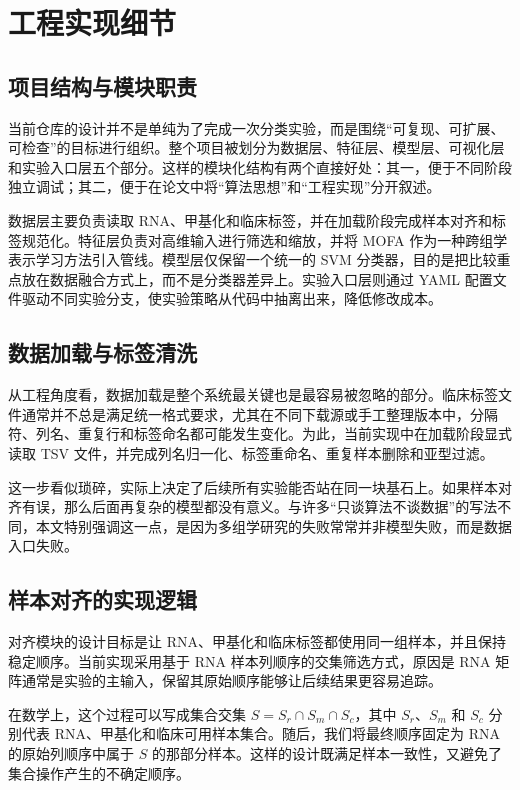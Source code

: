 \section{工程实现细节}

\subsection{项目结构与模块职责}

当前仓库的设计并不是单纯为了完成一次分类实验，而是围绕“可复现、可扩展、可检查”的目标进行组织。整个项目被划分为数据层、特征层、模型层、可视化层和实验入口层五个部分。这样的模块化结构有两个直接好处：其一，便于不同阶段独立调试；其二，便于在论文中将“算法思想”和“工程实现”分开叙述。

数据层主要负责读取 RNA、甲基化和临床标签，并在加载阶段完成样本对齐和标签规范化。特征层负责对高维输入进行筛选和缩放，并将 MOFA 作为一种跨组学表示学习方法引入管线。模型层仅保留一个统一的 SVM 分类器，目的是把比较重点放在数据融合方式上，而不是分类器差异上。实验入口层则通过 YAML 配置文件驱动不同实验分支，使实验策略从代码中抽离出来，降低修改成本。

\subsection{数据加载与标签清洗}

从工程角度看，数据加载是整个系统最关键也是最容易被忽略的部分。临床标签文件通常并不总是满足统一格式要求，尤其在不同下载源或手工整理版本中，分隔符、列名、重复行和标签命名都可能发生变化。为此，当前实现中在加载阶段显式读取 TSV 文件，并完成列名归一化、标签重命名、重复样本删除和亚型过滤。

这一步看似琐碎，实际上决定了后续所有实验能否站在同一块基石上。如果样本对齐有误，那么后面再复杂的模型都没有意义。与许多“只谈算法不谈数据”的写法不同，本文特别强调这一点，是因为多组学研究的失败常常并非模型失败，而是数据入口失败。

\subsection{样本对齐的实现逻辑}

对齐模块的设计目标是让 RNA、甲基化和临床标签都使用同一组样本，并且保持稳定顺序。当前实现采用基于 RNA 样本列顺序的交集筛选方式，原因是 RNA 矩阵通常是实验的主输入，保留其原始顺序能够让后续结果更容易追踪。

在数学上，这个过程可以写成集合交集 $S = S_r \cap S_m \cap S_c$，其中 $S_r$、$S_m$ 和 $S_c$ 分别代表 RNA、甲基化和临床可用样本集合。随后，我们将最终顺序固定为 RNA 的原始列顺序中属于 $S$ 的那部分样本。这样的设计既满足样本一致性，又避免了集合操作产生的不确定顺序。

